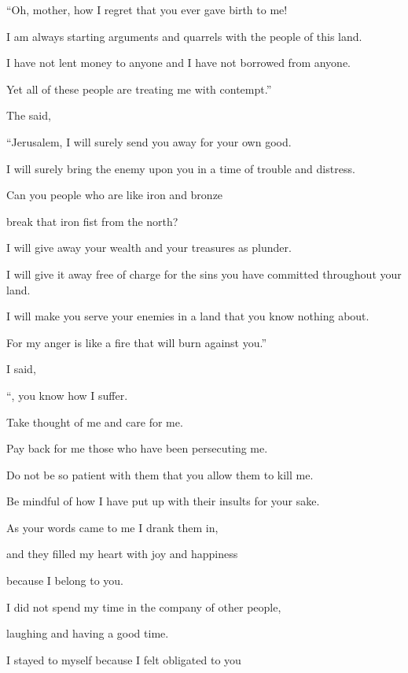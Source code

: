 {\par }{\Q “Oh,
mother,
how I regret
that
you ever gave birth
to me!
\par }{\Q I am always starting arguments
and quarrels
with the people
of this land.
\par }{\Q I have not
lent money
to anyone and I have not
borrowed
from anyone.
\par }{\Q Yet all
of these people are treating me with contempt.”
\par }{\PP {}The
{}
said,
\par }{\Q “Jerusalem, I will surely
send
you away
for your own good.
\par }{\Q I will surely
bring
the
enemy
upon
you in a time
of trouble
and distress.
\par }{\Q {}Can you people who are like iron
and bronze
\par }{\Q break that iron
fist from the north?
\par }{\Q {}I will give away your wealth
and your treasures
as plunder.
\par }{\Q I will give
it away free
of charge
for the sins
you have committed throughout
your land.
\par }{\Q {}I will make you serve
your enemies
in a land
that you know
nothing
about.
\par }{\Q For
my anger
is like
a fire
that will burn against you.”
\par }{\PP {}I said,

\par }{\Q “{}, you
know
how I
suffer.

\par }{\Q Take
thought of me and care
for me.
\par }{\Q Pay back
for me those who have been persecuting
me.
\par }{\Q Do not
be so
patient
with them
that you allow them to kill me.
\par }{\Q Be mindful
of how I have put up with their insults for your sake.
\par }{\Q {}As your words
came
to me I drank
them in,

\par }{\Q and they filled my heart
with joy
and happiness
\par }{\Q because
I belong
to you.
\par }{\Q {}I did not
spend my time in
the company of other people,
\par }{\Q laughing
and having a good time.
\par }{\Q I stayed
to myself because
I felt obligated
to you

}
